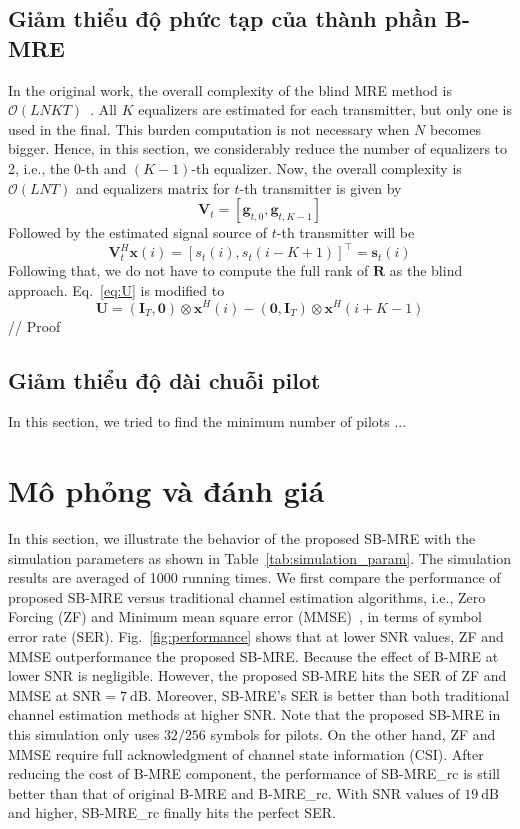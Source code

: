 \subsection{Giảm thiểu độ phức tạp của thành phần B-MRE}
In the original work, the overall complexity of the blind MRE method is $\mathcal{O}(LNKT)$~\cite{original}. All $K$ equalizers are estimated for each transmitter, but only one is used in the final. This burden computation is not necessary when $N$ becomes bigger. Hence, in this section, we considerably reduce the number of equalizers to 2, i.e., the $0$-th and \mbox{$(K-1)$-th} equalizer. Now, the overall complexity is $\mathcal{O}(LNT)$ and equalizers matrix for $t$-th transmitter is given by
\begin{equation}
    \mathbf{V}_{t} = [\mathbf{g}_{t, 0}, \mathbf{g}_{t, K-1}]
\end{equation}
Followed by the estimated signal source of $t$-th transmitter will be
\begin{equation}
    \mathbf{V}_t^H \mathbf{x}(i) = [s_t(i), s_t(i-K+1)]^\top = \mathbf{s}_{t}(i)
\end{equation}
Following that, we do not have to compute the full rank of $\mathbf{R}$ as the blind approach. Eq.~\ref{eq:U} is modified to
\begin{equation*}
\mathbf{U} = \left(\mathbf{I}_{T}, \mathbf{0}\right) \otimes \mathbf{x}^{H}(i)-\left(\mathbf{0}, \mathbf{I}_{T}\right) \otimes \mathbf{x}^{H}(i+K-1)
\end{equation*}
// Proof 
\subsection{Giảm thiểu độ dài chuỗi pilot}
In this section, we tried to find the minimum number of pilots ...

\section{Mô phỏng và đánh giá}

In this section, we illustrate the behavior of the proposed SB-MRE with the simulation parameters as shown in Table~\ref{tab:simulation_param}. The simulation results are averaged of 1000 running times. We first compare the performance of proposed SB-MRE versus traditional channel estimation algorithms, i.e., Zero Forcing (ZF) and Minimum mean square error (MMSE)~\cite{Jiang2011}, in terms of symbol error rate (SER). Fig.~\ref{fig:performance} shows that at lower SNR values, ZF and MMSE outperformance the proposed SB-MRE. Because the effect of B-MRE at lower SNR is negligible. However, the proposed SB-MRE hits the SER of ZF and MMSE at $\text{SNR}=7~\text{dB}$. Moreover, SB-MRE's SER is better than both traditional channel estimation methods at higher SNR. Note that the proposed SB-MRE in this simulation only uses $32/256$ symbols for pilots. On the other hand, ZF and MMSE require full acknowledgment of channel state information (CSI). After reducing the cost of B-MRE component, the performance of SB-MRE\_rc is still better than that of original B-MRE and B-MRE\_rc. With $\text{SNR values of~}19~\text{dB}$ and higher, SB-MRE\_rc finally hits the perfect SER.


